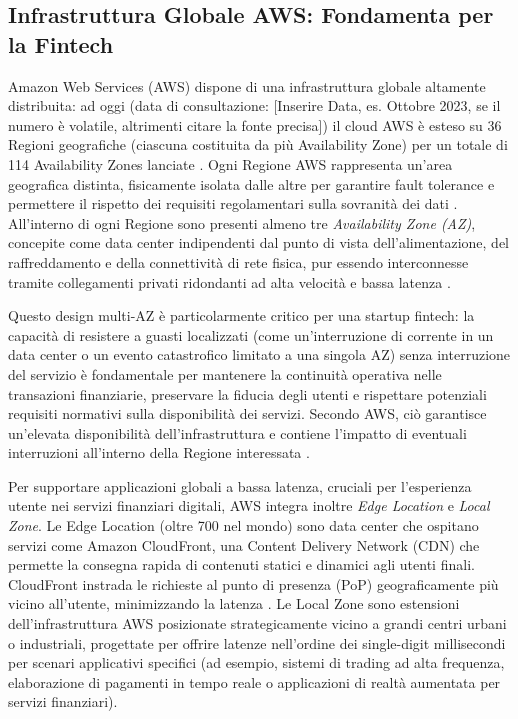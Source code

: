 \subsection{Infrastruttura Globale AWS: Fondamenta per la Fintech}
\label{sec:aws-global-infra-fintech}

Amazon Web Services (AWS) dispone di una infrastruttura globale altamente distribuita: ad oggi (data di consultazione: [Inserire Data, es. Ottobre 2023, se il numero è volatile, altrimenti citare la fonte precisa]) il cloud AWS è esteso su 36 Regioni geografiche (ciascuna costituita da più Availability Zone) per un totale di 114 Availability Zones lanciate \cite{aws-global-infra}. Ogni Regione AWS rappresenta un'area geografica distinta, fisicamente isolata dalle altre per garantire fault tolerance e permettere il rispetto dei requisiti regolamentari sulla sovranità dei dati \cite{aws-global-infra}. All'interno di ogni Regione sono presenti almeno tre \textit{Availability Zone (AZ)}, concepite come data center indipendenti dal punto di vista dell'alimentazione, del raffreddamento e della connettività di rete fisica, pur essendo interconnesse tramite collegamenti privati ridondanti ad alta velocità e bassa latenza \cite{aws-global-infra}.



Questo design multi-AZ è particolarmente critico per una startup fintech: la capacità di resistere a guasti localizzati (come un'interruzione di corrente in un data center o un evento catastrofico limitato a una singola AZ) senza interruzione del servizio è fondamentale per mantenere la continuità operativa nelle transazioni finanziarie, preservare la fiducia degli utenti e rispettare potenziali requisiti normativi sulla disponibilità dei servizi. Secondo AWS, ciò garantisce un'elevata disponibilità dell'infrastruttura e contiene l'impatto di eventuali interruzioni all'interno della Regione interessata \cite{aws-global-infra}.

Per supportare applicazioni globali a bassa latenza, cruciali per l'esperienza utente nei servizi finanziari digitali, AWS integra inoltre \textit{Edge Location} e \textit{Local Zone}. Le Edge Location (oltre 700 nel mondo) sono data center che ospitano servizi come Amazon CloudFront, una Content Delivery Network (CDN) che permette la consegna rapida di contenuti statici e dinamici agli utenti finali. CloudFront instrada le richieste al punto di presenza (PoP) geograficamente più vicino all'utente, minimizzando la latenza \cite{aws-cloudfront}. Le Local Zone sono estensioni dell'infrastruttura AWS posizionate strategicamente vicino a grandi centri urbani o industriali, progettate per offrire latenze nell'ordine dei single-digit millisecondi per scenari applicativi specifici (ad esempio, sistemi di trading ad alta frequenza, elaborazione di pagamenti in tempo reale o applicazioni di realtà aumentata per servizi finanziari).

